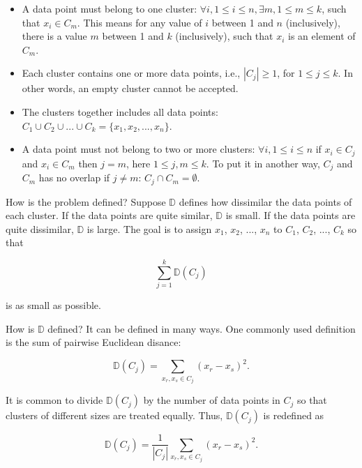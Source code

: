 \begin{itemize}
\item A data point must belong to one cluster: $\forall i, 1 \le i \le
  n, \exists m, 1 \le m \le k$, such that $x_i \in C_m$. This means
  for any value of $i$ between 1 and $n$ (inclusively), there is a
  value $m$ between 1 and $k$ (inclusively), such that $x_i$ is an
  element of $C_m$.

  
\item Each cluster contains one or more data points, i.e.,
  $|C_j| \ge 1$, for $1 \le j \le k$.  In other words, an
  empty cluster cannot be accepted.
  
\item The clusters together includes all data points: $C_1 \cup C_2
  \cup ... \cup C_k = \{x_1, x_2, ..., x_n\}$.

\item A data point must not belong to two or more clusters: $\forall
  i, 1 \le i \le n$ if $x_i \in C_j$ and $x_i \in C_m$ then $j = m$,
  here $1 \le j, m \le k$.  To put it in another way, $C_j$ and $C_m$
  has no overlap if $j \ne m$: $C_j \cap C_m = \emptyset$.
  
\end{itemize}

How is the problem defined? Suppose $\mathds{D}$ defines how
dissimilar the data points of each cluster.  If the data points are
quite similar, $\mathds{D}$ is small.  If the data points are quite
dissimilar, $\mathds{D}$ is large.  The goal is to assign
$x_1$, $x_2$, ..., $x_n$ to $C_1$, $C_2$, ..., $C_k$
so that

\begin{equation}
\underset{j = 1}{\overset{k}{\sum}} \mathds{D}(C_j) 
\end{equation}

is as small as possible.

How is $\mathds{D}$ defined?  It can be defined in many ways. One commonly
used definition is the sum of pairwise Euclidean disance:


\begin{equation}
\mathds{D}(C_j) = \underset{x_r, x_s \in C_j}{\sum} (x_r - x_s)^ 2.
\end{equation}

It is common to divide $\mathds{D}(C_j)$ by the number of data points
in $C_j$ so that clusters of different sizes
are treated equally. Thus, $\mathds{D}(C_j)$ is redefined as

\begin{equation}
\mathds{D}(C_j) = \frac{1}{|C_j|} \underset{x_r, x_s \in C_j}{\sum} (x_r - x_s)^ 2.
\end{equation}




